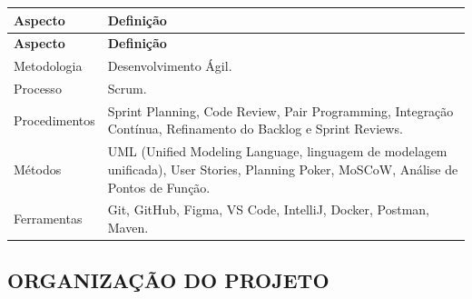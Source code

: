 \begingroup
\small
\setlength{\tabcolsep}{3pt}
\renewcommand{\arraystretch}{1.2}
\begin{longtable}{|>{\raggedright\arraybackslash}p{}|>{\raggedright\arraybackslash}p{}|}
\hline
\textbf{Aspecto} & \textbf{Definição} \\ \hline
\endfirsthead
\textbf{Aspecto} & \textbf{Definição} \\ \hline
\endhead
Metodologia & Desenvolvimento Ágil. \\ \hline
Processo & Scrum. \\ \hline
Procedimentos & Sprint Planning, Code Review, Pair Programming, Integração Contínua, Refinamento do Backlog e Sprint Reviews. \\ \hline
Métodos & UML (Unified Modeling Language, linguagem de modelagem unificada), User Stories, Planning Poker, MoSCoW, Análise de Pontos de Função. \\ \hline
Ferramentas & Git, GitHub, Figma, VS Code, IntelliJ, Docker, Postman, Maven. \\ \hline
\end{longtable}
\endgroup

\subsection{ORGANIZAÇÃO DO PROJETO}

